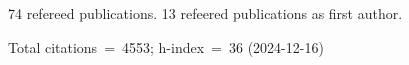 74 refereed publications. 13 refeered publications as first author.

Total citations~=~4553; h-index~=~36 (2024-12-16)